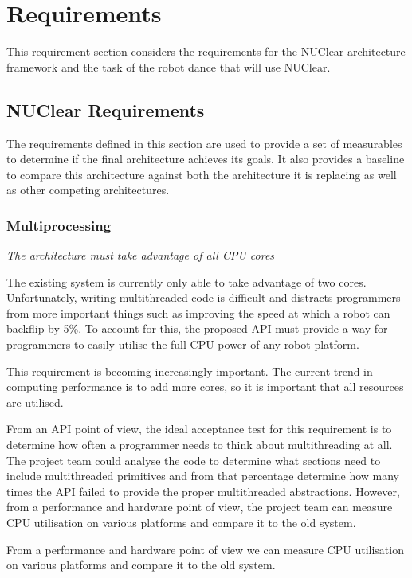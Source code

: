 \documentclass[english,12pt]{scrartcl}
\newcommand{\requirement}[1]{\textit{#1}}
\begin{document}
	\section{Requirements}
	This requirement section considers the requirements for the NUClear architecture framework and the task of the robot dance that will use NUClear.
		
		\subsection{NUClear Requirements}
			The requirements defined in this section are used to provide a set of measurables to determine if the final architecture achieves its goals.
			It also provides a baseline to compare this architecture against both the architecture it is replacing as well as other competing architectures. 
			
			\subsubsection{Multiprocessing}
				\requirement{The architecture must take advantage of all CPU cores}
	
				The existing system is currently only able to take advantage of two cores.
				Unfortunately, writing multithreaded code is difficult and distracts programmers from more important things such as improving the speed at which a robot can backflip by 5\%.
				To account for this, the proposed API must provide a way for programmers to easily utilise the full CPU power of any robot platform.
	
				This requirement is becoming increasingly important.
				The current trend in computing performance is to add more cores, so it is important that all resources are utilised. 
	
				From an API point of view, the ideal acceptance test for this requirement is to determine how often a programmer needs to think about multithreading at all.
				The project team could analyse the code to determine what sections need to include multithreaded primitives and from that percentage determine how many times the API failed to provide the proper multithreaded abstractions.
				However, from a performance and hardware point of view, the project team can measure CPU utilisation on various platforms and compare it to the old system.
	
				From a performance and hardware point of view we can measure CPU utilisation on various
				platforms and compare it to the old system.
	
\end{document}
